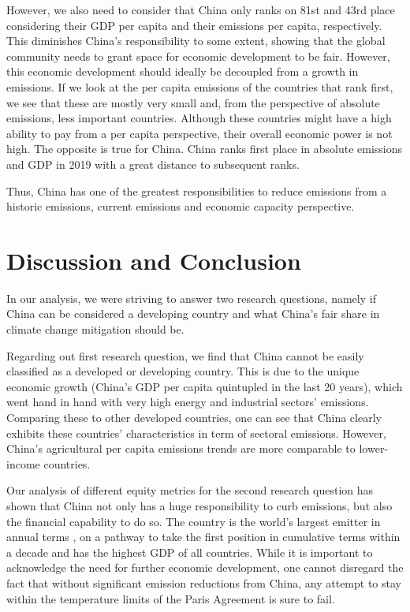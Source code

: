 \documentclass[
  12pt,
]{article}
\numberwithin{equation}{section}
\numberwithin{table}{section}
\numberwithin{figure}{section}
\begin{document}
However, we also need to consider that China only ranks on 81st and 43rd
place considering their GDP per capita and their emissions per capita,
respectively. This diminishes China's responsibility to some extent,
showing that the global community needs to grant space for economic
development to be fair. However, this economic development should
ideally be decoupled from a growth in emissions. If we look at the per
capita emissions of the countries that rank first, we see that these are
mostly very small and, from the perspective of absolute emissions, less
important countries. Although these countries might have a high ability
to pay from a per capita perspective, their overall economic power is
not high. The opposite is true for China. China ranks first place in
absolute emissions and GDP in 2019 with a great distance to subsequent
ranks.

Thus, China has one of the greatest responsibilities to reduce emissions
from a historic emissions, current emissions and economic capacity
perspective.

\hypertarget{discussion-and-conclusion}{%
\section{Discussion and Conclusion}\label{discussion-and-conclusion}}

In our analysis, we were striving to answer two research questions,
namely if China can be considered a developing country and what China's
fair share in climate change mitigation should be.

Regarding out first research question, we find that China cannot be
easily classified as a developed or developing country. This is due to
the unique economic growth (China's GDP per capita quintupled in the
last 20 years), which went hand in hand with very high energy and
industrial sectors' emissions. Comparing these to other developed
countries, one can see that China clearly exhibits these countries'
characteristics in term of sectoral emissions. However, China's
agricultural per capita emissions trends are more comparable to
lower-income countries.

Our analysis of different equity metrics for the second research
question has shown that China not only has a huge responsibility to curb
emissions, but also the financial capability to do so. The country is
the world's largest emitter in annual terms , on a pathway to take the
first position in cumulative terms within a decade and has the highest
GDP of all countries. While it is important to acknowledge the need for
further economic development, one cannot disregard the fact that without
significant emission reductions from China, any attempt to stay within
the temperature limits of the Paris Agreement is sure to fail.
\end{document}
